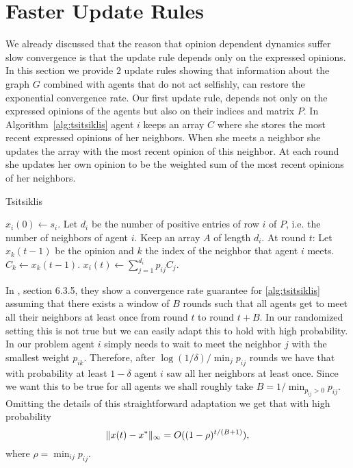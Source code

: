 \section{Faster Update Rules}\label{s:graph_aware}

We already discussed that the reason that opinion dependent dynamics suffer slow
convergence is that the update rule depends only on the expressed opinions.
In this section we provide $2$ update rules showing that information about the
graph $G$ combined with agents that do not act selfishly,
can restore the exponential convergence rate.
Our first update rule, depends not only on the expressed opinions of the
agents but also on their indices and matrix $P$.
In Algorithm~\ref{alg:tsitsiklis} agent $i$
keeps an array $C$ where she stores the most recent expressed opinions of
her neighbors.  When she meets a neighbor she updates the array with the
most recent opinion of this neighbor.
At each round she updates her own opinion to be the weighted sum of the
most recent opinions of her neighbors.
\begin{algorithm}
  \caption{Tsitsiklis}
  \label{alg:tsitsiklis}
  \begin{algorithmic}[1]
    \STATE $x_i(0) \gets s_i$.
    \STATE Let $d_i$ be the number of positive entries of row $i$ of $P$,
    i.e. the number of neighbors of agent $i$.
    \STATE Keep an array $A$ of length $d_i$.
    \STATE At round $t$:
    \bindent
    \STATE Let $x_k(t-1)$ be the opinion and $k$ the index of
    the neighbor that agent $i$ meets.
    \STATE $C_k \gets x_k(t-1)$.
    \STATE $x_i(t) \gets \sum_{j=1}^{d_i} p_{ij} C_j$.
    \eindent
\end{algorithmic}
\end{algorithm}
In \cite{BT97}, section 6.3.5, they show a convergence rate guarantee for
\ref{alg:tsitsiklis} assuming that there exists
a window of $B$ rounds such that all agents get to meet all their
neighbors at least once from round $t$ to round $t+B$.
In our randomized setting this is not true but we can easily adapt this to
hold with high probability. In our problem
agent $i$ simply needs to wait to meet the neighbor $j$ with the smallest
weight $p_{ik}$. Therefore, after $\log(1/\delta)/\min_{j} p_{ij}$ rounds
we have that with probability at least $1-\delta$ agent $i$ saw all her
neighbors at least once.  Since we want this to be true for all agents
we shall roughly take $B = 1/\min_{p_{ij} > 0} {p_{ij}}$.
Omitting the details of this straightforward adaptation
we get that with high probability
\[
  \| x(t) - x^* \|_{\infty} = O((1-\rho)^{t/(B+1)}),
\]
where $\rho = \min_{ij} p_{ij}$.

